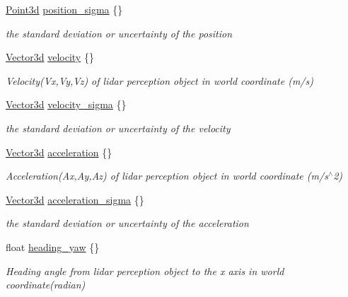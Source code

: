\begin{DoxyCompactItemize}
\hyperlink{structmaf__perception__interface_1_1Point3d}{Point3d} \hyperlink{structmaf__perception__interface_1_1LidarPerceptionObjectData_aa3c891f5faee1965dfa7e3392b4fac16}{position\+\_\+sigma} \{\}
\begin{DoxyCompactList}\small\item\em the standard deviation or uncertainty of the position \end{DoxyCompactList}\item 
\hyperlink{structmaf__perception__interface_1_1Vector3d}{Vector3d} \hyperlink{structmaf__perception__interface_1_1LidarPerceptionObjectData_ae1d3a87b602c44b55963562ec8f5b491}{velocity} \{\}
\begin{DoxyCompactList}\small\item\em Velocity(\+Vx,\+Vy,\+Vz) of lidar perception object in world coordinate (m/s) \end{DoxyCompactList}\item 
\hyperlink{structmaf__perception__interface_1_1Vector3d}{Vector3d} \hyperlink{structmaf__perception__interface_1_1LidarPerceptionObjectData_a4f13ce0aedba07e55a9081efd1fd5c35}{velocity\+\_\+sigma} \{\}
\begin{DoxyCompactList}\small\item\em the standard deviation or uncertainty of the velocity \end{DoxyCompactList}\item 
\hyperlink{structmaf__perception__interface_1_1Vector3d}{Vector3d} \hyperlink{structmaf__perception__interface_1_1LidarPerceptionObjectData_af16613f77aa0487ea7e73f1e6441757d}{acceleration} \{\}
\begin{DoxyCompactList}\small\item\em Acceleration(\+Ax,\+Ay,\+Az) of lidar perception object in world coordinate (m/s$^\wedge$2) \end{DoxyCompactList}\item 
\hyperlink{structmaf__perception__interface_1_1Vector3d}{Vector3d} \hyperlink{structmaf__perception__interface_1_1LidarPerceptionObjectData_a1adc2c7732754ec9908e3ec08f96583a}{acceleration\+\_\+sigma} \{\}
\begin{DoxyCompactList}\small\item\em the standard deviation or uncertainty of the acceleration \end{DoxyCompactList}\item 
float \hyperlink{structmaf__perception__interface_1_1LidarPerceptionObjectData_ae870d45af3680c177f23904a315c86e6}{heading\+\_\+yaw} \{\}
\begin{DoxyCompactList}\small\item\em Heading angle from lidar perception object to the x axis in world coordinate(radian) \end{DoxyCompactList}\item 

\end{DoxyCompactItemize}
